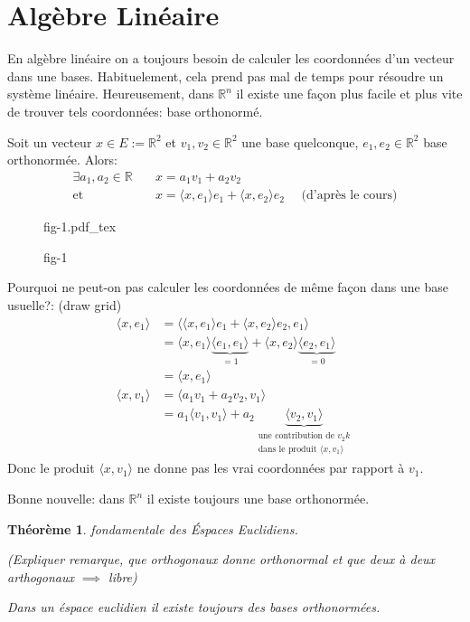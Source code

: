 \documentclass[a4paper]{article}
\newcommand{\R}{\mathbb{R}}
\newtheorem{theoreme}{Théorème}[section]
\newcommand{\scalair}[1]{\langle #1 \rangle}
\newcommand{\incfig}[1]{%
    \def\svgwidth{\columnwidth}
    {#1.pdf_tex}
}
\begin{document}
   \section{Algèbre Linéaire}
   En algèbre linéaire on a toujours besoin de calculer les coordonnées d'un vecteur dans une bases. Habituelement, cela prend pas mal de temps pour résoudre un système linéaire. 
   Heureusement, dans $\R^n$ il existe une façon plus facile et plus vite de trouver tels coordonnées: base orthonormé. 
    \par
        Soit un vecteur  $x \in E := \R^2$ et  $v_1, v_2 \in \R^2$ une base quelconque, $e_1, e_2 \in \R^2$ base orthonormée. Alors:
        \begin{align*}
            \exists a_1, a_2 \in \R \quad &x = a_1v_1 + a_2v_2\\
            \text{et }                    &x = \scalair{x, e_1}e_1 + \scalair{x, e_2}e_2 \quad \text{ (d'après le cours)}
        \end{align*}
\begin{figure}[H]
    \centering
    \incfig{fig-1}
    \caption{fig-1}
    \label{fig:fig-1}
\end{figure}
Pourquoi ne peut-on pas calculer les coordonnées de même façon dans une base usuelle?: (draw grid)
\begin{align*}
    \scalair{x, e_1} &= \scalair{\scalair{x, e_1}e_1 + \scalair{x, e_2}e_2, e_1}\\
                     &= \scalair{x, e_1}\underbrace{ \scalair{e_1,e_1} }_{= 1} + \scalair{x, e_2}\underbrace{\scalair{e_2, e_1}}_{= 0}\\
                     &= \scalair{x, e_1}\\
    \scalair{x, v_1} &= \scalair{a_1v_1 + a_2v_2, v_1}\\
                     &= a_1\scalair{v_1, v_1} + a_2\underbrace{ \scalair{v_2, v_1} }_{\substack{\text{une contribution de $v_2k$}\\\text{dans le produit $\scalair{x, v_1}$}}}
\end{align*}
Donc le produit $\scalair{x, v_1}$ ne donne pas les vrai coordonnées par rapport à $v_1$.
\par
Bonne nouvelle: dans $\R^n$ il existe toujours une base orthonormée.
\begin{theoreme}\label{thm:thm-fond}
   fondamentale des Éspaces Euclidiens. \par
   (Expliquer remarque, que orthogonaux donne orthonormal et que deux à deux arthogonaux $\implies$ libre)\par
   Dans un éspace euclidien il existe toujours des bases orthonormées.
\end{theoreme}
\end{document}
